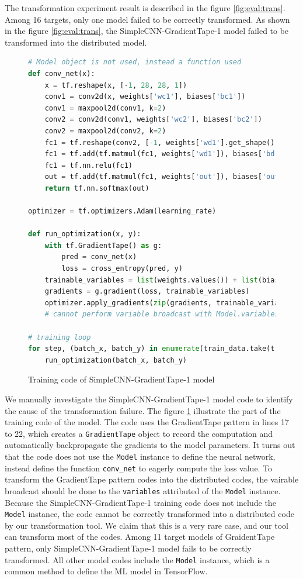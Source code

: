 The transformation experiment result is described in the 
figure \ref{fig:eval:trans}. Among 16 targets, only one model failed to
be correctly transformed. As shown in the figure \ref{fig:eval:trans},
the SimpleCNN-GradientTape-1 model failed to be transformed into the
distributed model.

\begin{figure}[!ht]
  \begin{lstlisting}[language=Python]
# Model object is not used, instead a function used
def conv_net(x):
    x = tf.reshape(x, [-1, 28, 28, 1])
    conv1 = conv2d(x, weights['wc1'], biases['bc1'])
    conv1 = maxpool2d(conv1, k=2)
    conv2 = conv2d(conv1, weights['wc2'], biases['bc2'])
    conv2 = maxpool2d(conv2, k=2)
    fc1 = tf.reshape(conv2, [-1, weights['wd1'].get_shape().as_list()[0]])
    fc1 = tf.add(tf.matmul(fc1, weights['wd1']), biases['bd1'])
    fc1 = tf.nn.relu(fc1)
    out = tf.add(tf.matmul(fc1, weights['out']), biases['out'])
    return tf.nn.softmax(out)

optimizer = tf.optimizers.Adam(learning_rate)

def run_optimization(x, y):
    with tf.GradientTape() as g:
        pred = conv_net(x)
        loss = cross_entropy(pred, y) 
    trainable_variables = list(weights.values()) + list(biases.values())
    gradients = g.gradient(loss, trainable_variables)
    optimizer.apply_gradients(zip(gradients, trainable_variables))
    # cannot perform variable broadcast with Model.variables

# training loop
for step, (batch_x, batch_y) in enumerate(train_data.take(training_steps), 1):
    run_optimization(batch_x, batch_y)
  \end{lstlisting}
  \caption{Training code of SimpleCNN-GradientTape-1 model}
  \label{fig:eval:simplecnn1}
\end{figure}

We manually investigate the SimpleCNN-GradientTape-1 model code to 
identify the cause of the transformation failure.
The figure \ref{fig:eval:simplecnn1} illustrate the part of the training code
of the model.
The code uses the GradientTape pattern in lines 17 to 22, which
creates a {\tt GradientTape} object to record the computation
and automatically backpropagate the gradients to the model parameters.
It turns out that the code does not use the {\tt Model} instance to
define the neural network, instead define the function {\tt conv\_net} 
to eagerly compute the loss value.
To transform the GradientTape pattern codes into the distributed codes,
the vairable broadcast should be done to the {\tt variables} attributed of
the {\tt Model} instance. Because the SimpleCNN-GradientTape-1 training code
does not include the {\tt Model} instance, the code cannot be correctly
transformed into a distributed code by our transformation tool.
We claim that this is a very rare case, and our tool can transform most of the
codes. Among 11 target models of GraidentTape pattern, only
SimpleCNN-GradientTape-1 model fails to be correctly transformed.
All other model codes include the {\tt Model} instance, 
which is a common method to define the ML model in TensorFlow. 

